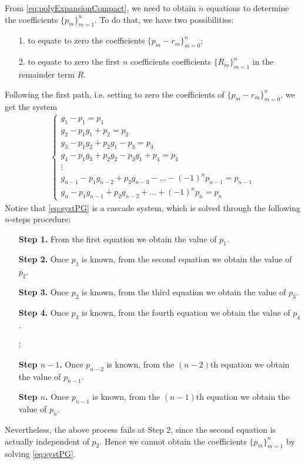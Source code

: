 \documentclass[a4paper]{article}
\numberwithin{equation}{section}
\begin{document}
{From \eqref{eq:polyExpansionCompact}, we need to obtain $n$ equations to determine the coefficients $\{p_m\}_{m=1}^n$. To do that, we have two possibilities: 
\begin{itemize}
	\item[1.] to equate to zero the coefficients $\{p_m-r_m\}_{m=0}^n$;
	\item[2.] to equate to zero the first $n$ coefficients coefficients $\{R_m\}_{m=1}^n$ in the remainder term $R$. 
\end{itemize}
Following the first path, i.e. setting to zero the coefficients of $\{p_m-r_m\}_{m=0}^n$, we get the system
\begin{align}\label{eq:systPG}
	\begin{cases}
		g_1-p_1 = p_1
		\\
		g_2-p_1g_1+p_2 = p_2
		\\
		g_3-p_1g_2+p_2g_1-p_3 = p_3
		\\
		g_4-p_1g_3+p_2g_2-p_3g_1+p_4 = p_4
		\\
		\vdots
		\\
		g_{n-1}-p_1g_{n-2}+p_2g_{n-3}-\ldots-(-1)^np_{n-1} = p_{n-1}
		\\
		g_n-p_1g_{n-1}+p_2g_{n-2}+\ldots+(-1)^np_n = p_n
	\end{cases}
\end{align}
Notice that \eqref{eq:systPG} is a cascade system, which is solved through the following $n$-steps procedure: 
\begin{itemize}
	\item[]\textbf{Step 1.} From the first equation we obtain the value of $p_1$.
	\item[]\textbf{Step 2.} Once $p_1$ is known, from the second equation we obtain the value of $p_2$.
	\item[]\textbf{Step 3.} Once $p_2$ is known, from the third equation we obtain the value of $p_3$.
	\item[]\textbf{Step 4.} Once $p_3$ is known, from the fourth equation we obtain the value of $p_4$.
	\item[] $\vdots$
	\item[]\textbf{Step $n-1$.} Once $p_{n-2}$ is known, from the $(n-2)$th equation we obtain the value of $p_{n-1}$.
	\item[]\textbf{Step $n$.} Once $p_{n-1}$ is known, from the $(n-1)$th equation we obtain the value of $p_n$.
\end{itemize}

Nevertheless, the above process fails at Step 2, since the second equation is actually independent of $p_2$. Hence we cannot obtain the coefficients $\{p_m\}_{m=1}^n$ by solving \eqref{eq:systPG}.

}
\end{document}
